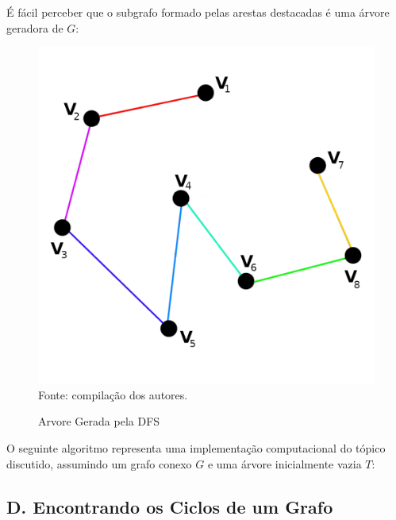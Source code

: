 \documentclass[twocolumn, 10pt]{extarticle}
\begin{document}
É fácil perceber que o subgrafo formado pelas arestas destacadas é uma árvore geradora de $G$:

\begin{figure}[H]
	\caption{Arvore Gerada pela DFS} 
	\centering
	\includegraphics[scale=0.7]{spanning2}
	\\ Fonte: compilação dos autores.
\end{figure}

O seguinte algoritmo representa uma implementação computacional do tópico discutido, assumindo um grafo conexo $G$ e uma árvore inicialmente vazia $T$:

\begingroup
{}\label{st}
\begin{algorithmic}[1]
	\EndFor
\EndFunction
\end{algorithmic}
\hrulefill
\endgroup

\subsection*{D. \quad Encontrando os Ciclos de um Grafo}
\end{document}
